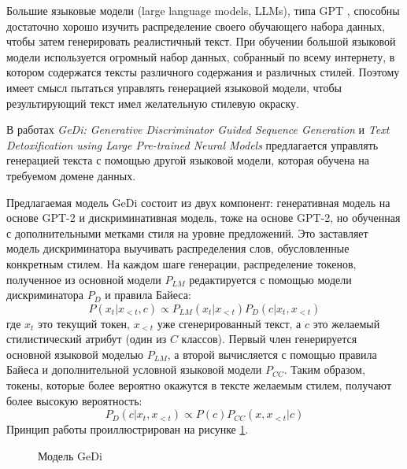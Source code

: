 Большие языковые модели (large language models, LLMs), типа GPT \cite{gpt2, gpt3}, способны достаточно хорошо изучить распределение своего обучающего набора данных, чтобы затем генерировать реалистичный текст.
При обучении большой языковой модели используется огромный набор данных, собранный по всему интернету, в котором содержатся тексты различного содержания и различных стилей.
Поэтому имеет смысл пытаться управлять генерацией языковой модели, чтобы результирующий текст имел желательную стилевую окраску.

В работах \textit{GeDi: Generative Discriminator Guided
Sequence Generation} \cite{krause2020gedi} и \textit{Text Detoxification using Large Pre-trained Neural Models} \cite{dale2021text} предлагается управлять генерацией текста с помощью другой языковой модели, которая обучена на требуемом домене данных.

Предлагаемая модель GeDi состоит из двух компонент:
генеративная модель на основе GPT-2 и дискриминативная модель, тоже на основе GPT-2, но обученная с дополнительными метками стиля на уровне предложений.
Это заставляет модель дискриминатора выучивать распределения слов, обусловленные конкретным стилем.
На каждом шаге генерации, распределение токенов, полученное из основной модели $P_{LM}$ редактируется с помощью модели дискриминатора $P_D$ и правила Байеса:
$$
P(x_t|x_{<t},c) \propto P_{LM}(x_t|x_{<t})P_D(c|x_t,x_{<t})
$$
где $x_t$ это текущий токен, $x_{<t}$ уже сгенерированный текст, а $c$ это желаемый стилистический атрибут (один из $C$ классов).
Первый член генерируется основной языковой моделью $P_{LM}$, а второй вычисляется с помощью правила Байеса и дополнительной условной языковой модели $P_{CC}$.
Таким образом, токены, которые более вероятно окажутся в тексте желаемым стилем, получают более высокую вероятность:
$$
P_D(c|x_t, x_{<t}) \propto P(c)P_{CC}(x,x_{<t}|c)
$$
Принцип работы проиллюстрирован на рисунке \ref{fig:gedi_original}.
\begin{figure}[ht]
  \centering
  \caption{Модель GeDi}
  \label{fig:gedi_original}
\end{figure}

